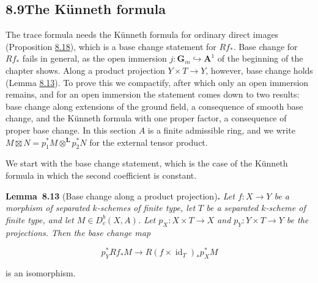 \documentclass[11pt]{article}
\newenvironment{bpstatement}[2]{\par\addvspace{0.6\baselineskip}\noindent\textbf{#1}#2\textbf{.}\enspace\ignorespaces}
  {\par\addvspace{0.4\baselineskip}}
\newenvironment{bpstatementit}[2]{\begin{bpstatement}{#1}{#2}\itshape\ignorespaces}{\end{bpstatement}}
\providecommand{\Dbc}{}\renewcommand{\Dbc}{D^b_c}
\begin{document}
\subsection*{\texorpdfstring{8.9\quad The Künneth formula}{8.9 The Künneth formula}}
\label{bp685}%
\label{bp686}%
The trace formula needs the Künneth formula for ordinary direct images (Proposition \hyperref[bp700]{8.18}), which is a base change statement for \(Rf_*\). Base change for \(Rf_*\) fails in general, as the open immersion \(j:\mathbf G_m\hookrightarrow\mathbf A^1\) of the beginning of the chapter shows. Along a product projection \(Y\times T\to Y\), however, base change holds (Lemma \hyperref[bp687]{8.13}). To prove this we compactify, after which only an open immersion remains, and for an open immersion the statement comes down to two results: base change along extensions of the ground field, a consequence of smooth base change, and the Künneth formula with one proper factor, a consequence of proper base change. In this section \(A\) is a finite admissible ring, and we write \(M\boxtimes N=p_1^*M\otimes^{\mathbf L}p_2^*N\) for the external tensor product.

We start with the base change statement, which is the case of the Künneth formula in which the second coefficient is constant.

\label{bp687}%
\begin{bpstatementit}{Lemma~8.13}{ (Base change along a product projection)}
Let \(f:X\to Y\) be a morphism of separated \(k\)-schemes of finite type, let \(T\) be a separated \(k\)-scheme of finite type, and let \(M\in\Dbc(X,A)\).  Let \(p_X:X\times T\to X\) and \(p_Y:Y\times T\to Y\) be the projections.  Then the base change map

\[
p_Y^*Rf_*M\longrightarrow R(f\times\operatorname{id}_T)_*p_X^*M
\]

is an isomorphism.
\end{bpstatementit}
\end{document}
